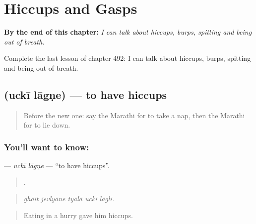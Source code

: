 
\chapter{Hiccups and Gasps}
\label{ch:mr-hiccups-and-gasps}

\begin{chapteropening}
\textbf{By the end of this chapter:} \emph{I can talk about hiccups, burps, spitting and being out of breath.}

Complete the last lesson of chapter 492: I can talk about hiccups, burps, spitting and being out of breath.
\end{chapteropening}

\section[\texorpdfstring{\mr{उचकी} \mr{लागणे} (uckī lāgṇe)}{उचकी लागणे (uckī lāgṇe)}]{  (uckī lāgṇe) — to have hiccups}

\label{lesson:MR-C492-ucki-lagne}



\begin{quote}
Before the new one: say the Marathi for to take a nap, then the Marathi for to lie down.
\end{quote}

\subsection*{You'll want to know:  }
\textbf{ } — \emph{uckī lāgṇe} — \textquotedblleft{}to have hiccups\textquotedblright{}.

\begin{quote}
    .
\end{quote}

\begin{quote}
\emph{ghāīt jevlyāne tyālā uckī lāglī.}
\end{quote}

\begin{quote}
Eating in a hurry gave him hiccups.
\end{quote}

